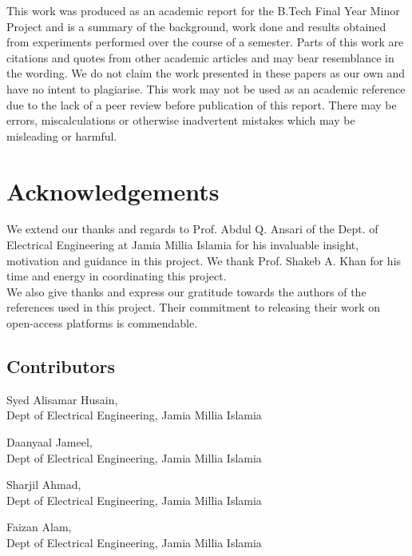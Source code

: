 \documentclass[a4paper]{article}
\begin{document}
  This work was produced as an academic report for the B.Tech Final Year Minor Project and
  is a summary of the background, work done and results obtained from experiments performed over
  the course of a semester.
  Parts of this work are citations and quotes from
  other academic articles and may bear resemblance in the wording. We do not claim the work
  presented in these papers as our own and have no intent to plagiarise.
  This work may not be used as an academic reference due to the lack of a peer review before 
  publication of this report. There may be errors, miscalculations or otherwise inadvertent
  mistakes which may be misleading or harmful.
  \vspace*{\fill}
  \thispagestyle{empty}

  \newpage
  \vspace*{1in}
  \section*{Acknowledgements}
  We extend our thanks and regards to Prof. Abdul Q. Ansari of the Dept. of Electrical Engineering 
  at Jamia Millia Islamia for his invaluable insight, motivation and guidance in this project.
  We thank Prof. Shakeb A. Khan for his time and energy in coordinating  this project.\\

  We also give thanks and express our gratitude towards the authors of the references used in this
  project. Their commitment to releasing their work on open-access platforms is commendable.

    \subsection*{Contributors}
    \begin{list}{}{}
      \item Syed Alisamar Husain,\\ Dept of Electrical Engineering, Jamia Millia Islamia
      \item Daanyaal Jameel,\\ Dept of Electrical Engineering, Jamia Millia Islamia
      \item Sharjil Ahmad,\\ Dept of Electrical Engineering, Jamia Millia Islamia
      \item Faizan Alam,\\ Dept of Electrical Engineering, Jamia Millia Islamia
    \end{list}
  \vspace*{\fill}
  \thispagestyle{empty}
\end{document}
